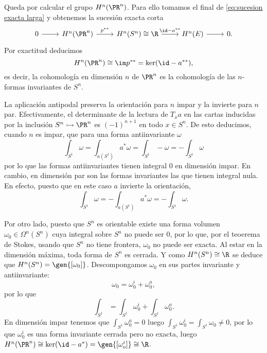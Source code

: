 \documentclass[12pt]{article}
\begin{document}
Queda por calcular el grupo \( H^n(\PR^n) \). Para ello tomamos el final de
\eqref{eq:sucesion exacta larga} y obtenemos la sucesión exacta corta
\begin{equation*}
	\begin{tikzcd}
		0 \arrow[r] & H^n(\PR^n) \arrow[r, "p^{\ast \ast}"] & H^n(S^n) \cong \R \arrow[r, "\id -
		a^{\ast \ast}"] & H^n(E) \arrow[r] & 0.
	\end{tikzcd}
\end{equation*}
Por exactitud deducimos
\begin{equation*}
	H^n(\PR^n) \cong \im p^{\ast \ast}= \ker(\id - a^{\ast \ast}),
\end{equation*}
es decir, la cohomología en dimensión \( n \) de \( \PR^n \) es la cohomología de las \(
n \)-formas invariantes de \( S^n \). 

La aplicación antipodal preserva la orientación para \( n \) impar y la invierte para \( n
\) par. Efectivamente, el determinante de la lectura de \( T_xa \) en las cartas inducidas
por la inclusión \( S^n \rightarrowtail \PR^n \) es \( (-1)^{n+1} \) en todo \( x \in S^n
\). De esto deducimos, cuando \( n \) es impar, que para una forma antiinvariante \( \omega \) 
\begin{equation*}
	\int_{S^1} \omega = \int_{a(S^1)} a^\ast \omega = \int_{S^1} -\omega = -\int_{S^1}
	\omega
\end{equation*}
por lo que las formas antiinvariantes tienen integral 0 en dimensión impar. En cambio, en
dimensión par son las formas invariantes las que tienen integral nula. En efecto, puesto
que en este caso \( a \) invierte la orientación,
\begin{equation*}
	\int_{S^1} \omega = -\int_{a(S^1)} a^\ast \omega = - \int_{S^1} \omega.
\end{equation*}

Por otro lado, puesto que \( S^n \) es orientable existe una forma volumen \( \omega_0 \in
\Omega^n(S^n) \) cuya integral sobre \( S^n \) no puede ser 0, por lo que, por el teoerema
de Stokes, usando que \( S^n \) no tiene frontera, \( \omega_0 \) no puede ser exacta.  Al
estar en la dimensión máxima, toda forma de \( S^n \) es cerrada.  Y como \( H^n(S^n)
\cong \R \) se deduce que \( H^n(S^n) = \gen{[\omega_0]} \). Descompongamos \( \omega_0 \)
en sus partes invariante y antiinvariante:
\begin{equation*}
	\omega_0 = \omega_0^i + \omega_0^a,
\end{equation*}
por lo que
\begin{equation*}
	\int_{S^1} = \int_{S^1} \omega_0^i + \int_{S^1} \omega_0^a.
\end{equation*}
En dimensión impar tenemos que \( \int_{S^1} \omega_0^a = 0 \) luego \( \int_{S^1}
\omega_0^i = \int_{S^1} \omega_0 \neq 0 \), por lo que \( \omega_0^i \) es una forma
invariante cerrada pero no exacta, luego \( H^n(\PR^n) \cong \ker(\id - a^\ast) =
\gen{[\omega_o^i]} \cong \R \).
\end{document}
